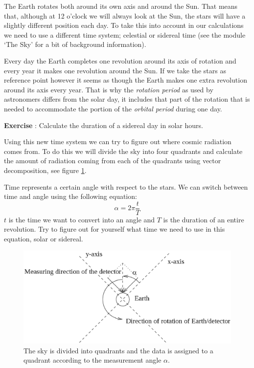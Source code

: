 \documentclass[12pt,a4paper]{article}
\numberwithin{equation}{section}
\numberwithin{figure}{section}
\newcounter{Exercise}
\numberwithin{table}{section}
\begin{document}
The Earth rotates both around its own axis and around the Sun. That means that, although at 12 o'clock we will always look at the Sun, the stars will have a slightly different position each day. To take this into account in our calculations we need to use a different time system; celestial or sidereal time (see the module `The Sky' for a bit of background information). 

Every day the Earth completes one revolution around its axis of rotation and every year it makes one revolution around the Sun. If we take the stars as reference point however it seems as though the Earth makes one extra revolution around its axis every year. That is why the \textit{rotation period} as used by astronomers differs from the solar day, it includes that part of the rotation that is needed to accommodate the portion of the \textit{orbital period} during one day.

\begin{shaded}
\textbf{Exercise \theExercise {}} : Calculate the duration of a sidereal day in solar hours.\end{shaded}

Using this new time system we can try to figure out where cosmic radiation comes from. To do this we will divide the sky into four quadrants and calculate the amount of radiation coming from each of the quadrants using vector decomposition, see figure \ref{fig:measuring_angle}.

Time represents a certain angle with respect to the stars. We can switch between time and angle using the following equation:
\begin{equation} \alpha = 2 \pi \frac{t}{T} \label{eq:time} \end{equation}
$t$ is the time we want to convert into an angle and $T$ is the duration of an entire revolution. Try to figure out for yourself what time we need to use in this equation, solar or sidereal.

\begin{figure}\begin{center}
\includegraphics[scale=0.5]{measuring_angle.eps}
\caption{The sky is divided into quadrants and the data is assigned to a quadrant according to the measurement angle $\alpha$.}\label{fig:measuring_angle}
\end{center}\end{figure}
\end{document}

